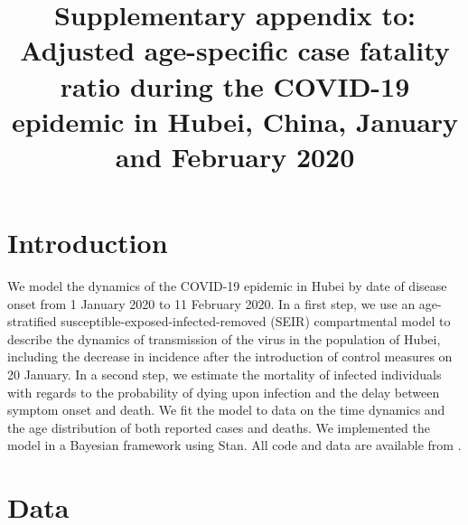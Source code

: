 \documentclass{article}
\title{Supplementary appendix to: \\ {\Large Adjusted age-specific case fatality ratio during the COVID-19 epidemic in Hubei, China, January and February 2020}}
\begin{document}
\maketitle

\section{Introduction}

We model the dynamics of the COVID-19 epidemic in Hubei by date of disease onset from 1 January 2020 to 11 February 2020. 
In a first step, we use an age-stratified susceptible-exposed-infected-removed (SEIR) compartmental model to describe the dynamics of transmission of the virus in the population of Hubei, including the decrease in incidence after the introduction of control measures on 20 January.
In a second step, we estimate the mortality of infected individuals with regards to the probability of dying upon infection and the delay between symptom onset and death. 
We fit the model to data on the time dynamics and the age distribution of both reported cases and deaths.
We implemented the model in a Bayesian framework using Stan. 
All code and data are available from \underline{}.

\section{Data}
\end{document}
